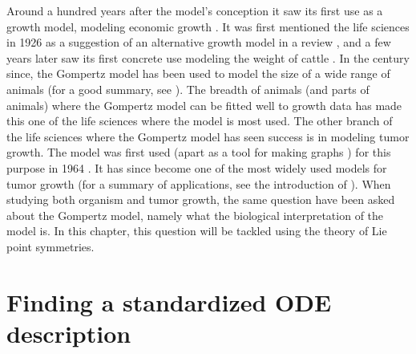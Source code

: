 Around a hundred years after the model's conception it saw its first use as a growth model, modeling economic growth \cite{prescott1922demand,peabody1924railway}.
It was first mentioned the life sciences in 1926 as a suggestion of an alternative growth model in a review \cite{wright1926reviews}, and a few years later saw its first concrete use modeling the weight of cattle \cite{davidson1928growth}.
In the century since, the Gompertz model has been used to model the size of a wide range of animals (for a good summary, see \cite{tjorve2017gompertz}).
The breadth of animals (and parts of animals) where the Gompertz model can be fitted well to growth data has made this one of the life sciences where the model is most used.
The other branch of the life sciences where the Gompertz model has seen success is in modeling tumor growth.
The model was first used (apart as a tool for making graphs \cite{casey1934alteration}) for this purpose in 1964 \cite{laird1964dynamics}.
It has since become one of the most widely used models for tumor growth \cite{gerlee2013muddle} (for a summary of applications, see the introduction of \cite{benzekry2014classical}).
When studying both organism and tumor growth, the same question have been asked about the Gompertz model, namely what the biological interpretation of the model is.
In this chapter, this question will be tackled using the theory of Lie point symmetries.

\section{Finding a standardized ODE description}

